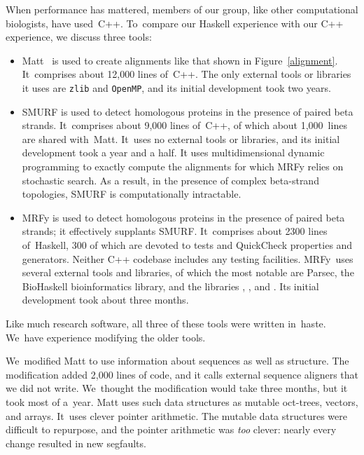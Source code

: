 \documentclass[preprint,nonatbib,blockstyle,times]{sigplanconf}
\newcommand\figref[1]{Figure~\ref{#1}}
\let\cite\citep
\begin{document}
When performance has mattered, members of our group, like other
computational biologists, have used~C++.
To~compare our Haskell experience with our C++ experience,
we discuss three tools:
\begin{itemize}
\item
Matt~\cite{Menke:2008wu} is used to create alignments like that shown
in \figref{alignment}.
It~comprises about 12,000 lines of~C++.
The only external tools or libraries it uses are \texttt{zlib}
and \texttt{OpenMP}, and its initial development took two years.
\item
SMURF
\cite{Menke:2010ti} is used to detect homologous proteins in the presence
of paired beta strands.
It~comprises about 9,000 lines of~C++, of which about 1,000~lines are
shared with~Matt.
It~uses no external tools or libraries, and
its initial development took a year and a half.
It uses multidimensional dynamic programming to exactly compute the alignments
for which MRFy relies on stochastic search.
As a result, in the presence of complex beta-strand topologies, SMURF is
computationally intractable.
\item
MRFy is used to detect homologous proteins in the presence of paired
beta strands; it effectively supplants SMURF.
It~comprises about 2300 lines of~Haskell, 300 of which are devoted
to tests and QuickCheck properties and generators.
Neither C++ codebase includes any testing facilities.
MRFy~uses several external tools and libraries, of which the most
notable are Parsec, the BioHaskell bioinformatics library, and
the libraries , ,
and .
Its initial development took about three months.
\end{itemize}
Like much research software, all three of these tools were written
 in~haste.
We~have experience modifying the older tools.



We~modified Matt to use information about sequences as well as structure.
The modification added 2,000 lines of code, and it calls
external sequence aligners that we did not write.
We~thought the modification would take three months, 
but it took most of a~year.
Matt uses such
data structures as mutable oct-trees, vectors, and arrays.
It~uses clever pointer arithmetic.
The mutable data structures were difficult to 
repurpose, and the pointer arithmetic was \emph{too} clever: 
nearly every change resulted in new segfaults.
\end{document}
